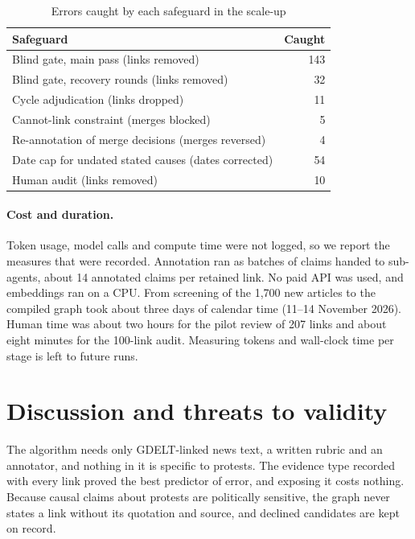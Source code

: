 \documentclass[pdflatex,sn-basic,lineno]{sn-jnl}
\theoremstyle{thmstylethree}
\theoremstyle{thmstyleone}
\begin{document}
\begin{table}[!htbp]
\caption{Errors caught by each safeguard in the scale-up}
\label{tab:guards}
\footnotesize
\begin{tabular*}{\textwidth}{@{\extracolsep\fill}lr@{}}
\toprule
Safeguard & Caught \\
\midrule
Blind gate, main pass (links removed) & 143 \\
Blind gate, recovery rounds (links removed) & 32 \\
Cycle adjudication (links dropped) & 11 \\
Cannot-link constraint (merges blocked) & 5 \\
Re-annotation of merge decisions (merges reversed) & 4 \\
Date cap for undated stated causes (dates corrected) & 54 \\
Human audit (links removed) & 10 \\
\bottomrule
\end{tabular*}
\end{table}

\paragraph{Cost and duration.} Token usage, model calls and compute time were not logged, so we
report the measures that were recorded. Annotation ran as batches of claims handed to sub-agents, about 14 annotated claims per
retained link. No
paid API was used, and embeddings ran on a CPU. From screening of the 1{,}700 new articles to the
compiled graph took about three days of calendar time (11--14 November 2026). Human time was
about two hours for the pilot review of 207 links and about eight minutes for the 100-link audit.
Measuring tokens and wall-clock time per stage is left to future runs.

\section{Discussion and threats to validity}\label{sec:discussion}

The algorithm needs only GDELT-linked news text, a written rubric and an annotator, and nothing in
it is specific to protests. The evidence type recorded with every link proved the best predictor
of error, and exposing it costs nothing. Because causal claims about protests are politically
sensitive, the graph never states a link without its quotation and source, and declined candidates
are kept on record.
\end{document}
